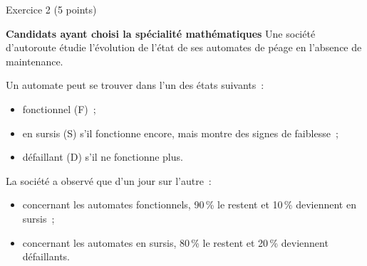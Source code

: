
%
\begin{h2}Exercice 2 (5 points)\end{h2}
\textbf{Candidats ayant choisi la spécialité \og mathématiques \fg{}}
\medskip
Une société d'autoroute étudie l'évolution de l'état de ses automates de péage en
l'absence de maintenance.
\par
Un automate peut se trouver dans l'un des états suivants~:
\begin{itemize}
     \item fonctionnel (F)~;
     \item en sursis (S) s'il fonctionne encore, mais montre des signes de faiblesse~;
     \item défaillant (D) s'il ne fonctionne plus.
\end{itemize}
La société a observé que d'un jour sur l'autre~:
\begin{itemize}
     \item concernant les automates fonctionnels, 90\,\% le restent et 10\,\% deviennent
     en sursis~;
     \item concernant les automates en sursis, 80\,\% le restent et 20\,\% deviennent
     défaillants.
\end{itemize}
\bigskip
